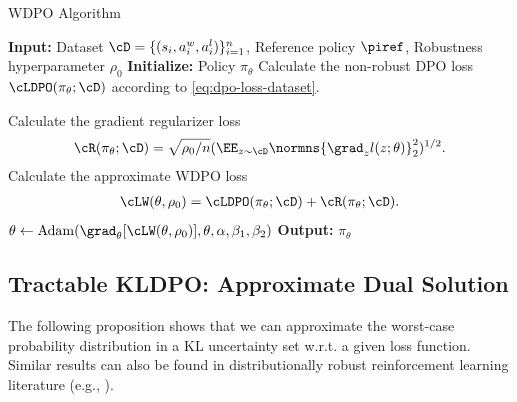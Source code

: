 \begin{algorithm}[ht]
	\caption{WDPO Algorithm}	
	\begin{algorithmic}[1]\label{algo:WDPO-with-gradient-regularizer}
	\STATE \textbf{Input:} Dataset $\cD=\{(s_i,a^w_i,a^l_i)\}_{i=1}^n$, Reference policy $\piref$, Robustness hyperparameter $\rho_0$
		\STATE \textbf{Initialize:} Policy $\pi_\theta$
		\STATE Calculate the non-robust DPO loss $\cLDPO(\pi_\theta;\cD)$ according to \cref{eq:dpo-loss-dataset}.
  
  \STATE Calculate the gradient regularizer loss
  \begin{align*}
      \cR(\pi_\theta;\cD) = \sqrt{\rho_0/n} (\EE_{z\sim\cD}\normns{\grad_z l(z; \theta)}_2^2 )^{1/2}. 
  \end{align*}
  \STATE Calculate the approximate WDPO loss 
  \begin{align*}
      \cLW(\theta,\rho_0) = \cLDPO(\pi_\theta;\cD)+\cR(\pi_\theta;\cD).
  \end{align*}
  \STATE $\theta \leftarrow \mathrm{Adam}(\grad_\theta [\cLW(\theta,\rho_0)], \theta,\alpha,\beta_1,\beta_2)$
		\ENDWHILE
		\STATE \textbf{Output:} $\pi_\theta$
	\end{algorithmic}
\end{algorithm}

\subsection{Tractable KLDPO: Approximate Dual Solution}
The following proposition shows that we can approximate the worst-case probability distribution in a KL uncertainty set w.r.t. a given loss function.  Similar results can also be found in distributionally robust reinforcement learning literature (e.g., \citet{gadot2024bring}).

